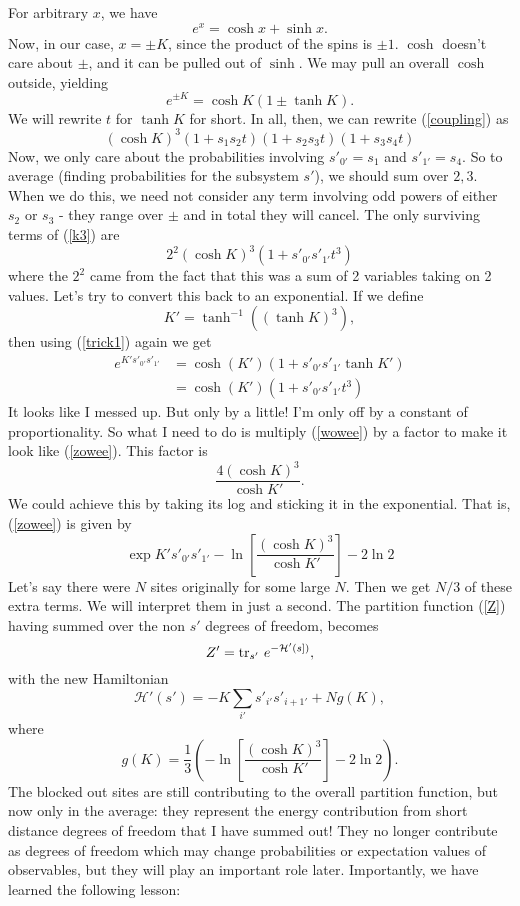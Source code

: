 \documentclass[main.tex]{subfiles}
\begin{document}
For arbitrary $x$, we have
\[
e^x = \cosh x + \sinh x.
\]
Now, in our case, $x = \pm K$, since the product of the spins is $\pm 1$. $\cosh$ doesn't care about $\pm$, and it can be pulled out of $\sinh$. We may pull an overall $\cosh$ outside, yielding 
\begin{equation} \label{trick1}
e^{\pm K} = \cosh K (1 \pm \tanh K).
\end{equation}
We will rewrite $t$ for $\tanh K$ for short. In all, then, we can rewrite (\ref{coupling}) as 
\begin{equation} \label{k3}
(\cosh K)^3 (1 + s_1 s_2 t) (1 + s_2 s_3 t) (1 + s_3 s_4 t) 
\end{equation}
Now, we only care about the probabilities involving $s'_{0'} = s_1$ and $s'_{1'} = s_4$. So to average (finding probabilities for the subsystem $s'$), we should sum over $2,3$. When we do this, we need not consider any term involving odd powers of either $s_2$ or $s_3$ - they range over $\pm$ and in total they will cancel. The only surviving terms of (\ref{k3}) are
\begin{equation} \label{zowee}
2^2 (\cosh K)^3 (1 + s'_{0'} s'_{1'} t^3)
\end{equation}
where the $2^2$ came from the fact that this was a sum of 2 variables taking on 2 values. Let's try to convert this back to an exponential. If we define
\begin{equation} \label{rgequation}
K' = \tanh^{-1} ((\tanh K)^3),
\end{equation}
then using (\ref{trick1}) again we get
\begin{align} \label{wowee}
e^{K' s'_{0'} s'_{1'}} & = \cosh (K') (1 + s'_{0'} s'_{1'} \tanh K') \\ & = \cosh(K')(1 + s'_{0'} s'_{1'} t^3 )
\end{align}
It looks like I messed up. But only by a little! I'm only off by a constant of proportionality. So what I need to do is multiply (\ref{wowee}) by a factor to make it look like (\ref{zowee}). This factor is
\[
\frac{4(\cosh K)^3}{\cosh K'}.
\]
We could achieve this by taking its log and sticking it in the exponential. That is, (\ref{zowee}) is given by
\[
\exp{K's'_{0'} s'_{1'} - \ln \left[
\frac{(\cosh K)^3}{\cosh K'}
\right] - 2 \ln 2}
\]
Let's say there were $N$ sites originally for some large $N$.  Then we get $N/3$ of these extra terms. We will interpret them in just a second. The partition function (\ref{Z}) having summed over the non $s'$ degrees of freedom, becomes
\[
Z' = \tr_{s'} \, e^{-\mathcal{H}'(s])},
\]
with the new Hamiltonian 
\[
\mathcal{H}'(s') = - K \sum_{i'} s'_{i'} s'_{i+1'} + N g(K),
\]
where
\[
g(K) = \frac{1}{3} \left(-\ln \left[
\frac{(\cosh K)^3}{\cosh K'} 
\right]
-2 \ln 2
\right).
\]
The blocked out sites are still contributing to the overall partition function, but now only in the average: they represent the energy contribution from short distance degrees of freedom that I have summed out! They no longer contribute as degrees of freedom which may change probabilities or expectation values of observables, but they will play an important role later. Importantly, we have learned the following lesson: 
\end{document}
